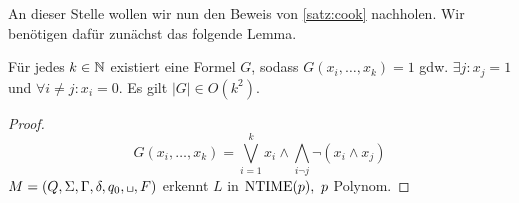 
An dieser Stelle wollen wir nun den Beweis von \autoref{satz:cook} nachholen.
Wir benötigen dafür zunächst das folgende Lemma.
\begin{lemma}
	Für jedes $k\in\mathbb{N}$ existiert eine Formel $G$, sodass $G(x_i,\dots,x_k)=1$ gdw. $\exists j: x_j = 1$ und $\forall i \neq j: x_i = 0$. Es gilt $|G| \in O(k^2)$.
\end{lemma}
\begin{proof}
	\[ G(x_i,\dots,x_k) = \bigvee_{i=1}^k x_i\land \bigwedge_{i\neg j}\neg (x_i\land x_j) \]
	$M=(Q,\Sigma,\Gamma,\delta,q_0,\blank,F)$ erkennt $L$ in $\operatorname{NTIME}(p),\ p$ Polynom.
\end{proof}


